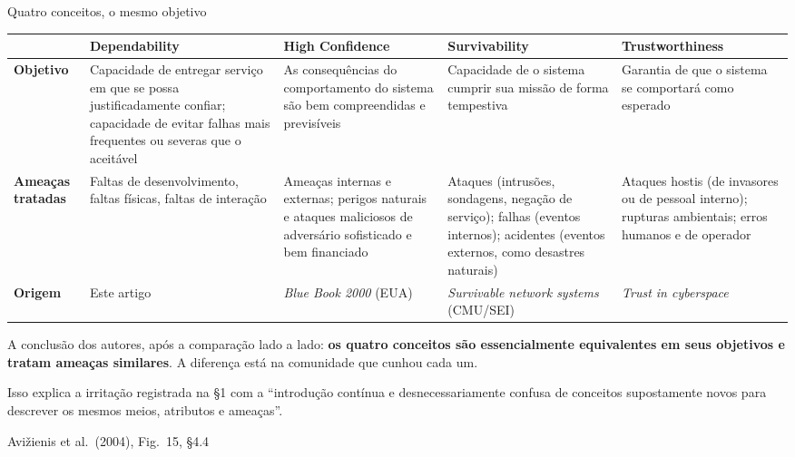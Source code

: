 \documentclass{beamer}
\newcommand{\sect}[1]{\par\smallskip\hfill{\tiny\color{black!55}Avi\v{z}ienis et al.\ (2004), #1}}
\begin{document}
\begin{frame}{Quatro conceitos, o mesmo objetivo}
    \tiny
    \begin{tabularx}{\linewidth}{@{}p{1.05cm} >{\raggedright\arraybackslash}X >{\raggedright\arraybackslash}X >{\raggedright\arraybackslash}X >{\raggedright\arraybackslash}X@{}}
        \toprule
        & \textbf{Dependability} & \textbf{High Confidence} & \textbf{Survivability} & \textbf{Trustworthiness} \\
        \midrule
        \textbf{Objetivo}
        & Capacidade de entregar servi\c{c}o em que se possa justificadamente confiar; capacidade de evitar falhas mais frequentes ou severas que o aceit\'avel
        & As consequ\^encias do comportamento do sistema s\~ao bem compreendidas e previs\'iveis
        & Capacidade de o sistema cumprir sua miss\~ao de forma tempestiva
        & Garantia de que o sistema se comportar\'a como esperado \\
        \addlinespace
        \textbf{Amea\c{c}as tratadas}
        & Faltas de desenvolvimento, faltas f\'isicas, faltas de intera\c{c}\~ao
        & Amea\c{c}as internas e externas; perigos naturais e ataques maliciosos de advers\'ario sofisticado e bem financiado
        & Ataques (intrus\~oes, sondagens, nega\c{c}\~ao de servi\c{c}o); falhas (eventos internos); acidentes (eventos externos, como desastres naturais)
        & Ataques hostis (de invasores ou de pessoal interno); rupturas ambientais; erros humanos e de operador \\
        \addlinespace
        \textbf{Origem}
        & Este artigo
        & \textit{Blue Book 2000} (EUA)
        & \textit{Survivable network systems} (CMU/SEI)
        & \textit{Trust in cyberspace} \\
        \bottomrule
    \end{tabularx}
    \medskip
    \begin{ancora}
        \scriptsize
        A conclus\~ao dos autores, ap\'os a compara\c{c}\~ao lado a lado: \textbf{os quatro conceitos s\~ao essencialmente equivalentes em seus objetivos e tratam amea\c{c}as similares}. A diferen\c{c}a est\'a na comunidade que cunhou cada um.
    \end{ancora}
    \medskip
    {\scriptsize Isso explica a irrita\c{c}\~ao registrada na \S1 com a ``introdu\c{c}\~ao cont\'inua e desnecessariamente confusa de conceitos supostamente novos para descrever os mesmos meios, atributos e amea\c{c}as''.}
    \sect{Fig.\ 15, \S4.4}
\end{frame}
\end{document}
